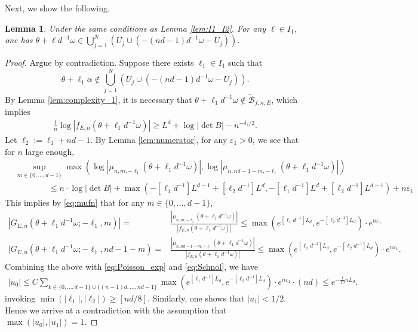 \documentclass[11pt]{amsart}
\newtheorem{lemma}[theorem]{Lemma}
\begin{document}
Next, we show the following.
\begin{lemma}\label{lem:I1_small}
Under the same conditions as Lemma \ref{lem:I1_I2}.
For any $\ell\in I_1$, one has $\theta+\ell d^{-1}\omega\in \bigcup_{j=1}^{N}(U_j\cup (-(nd-1)d^{-1}\omega-U_j))$.
\end{lemma}
\begin{proof}
Argue by contradiction. 
Suppose there exists $\ell_1\in I_1$ such that 
$$\theta+\ell_1\alpha\notin \bigcup_{j=1}^{N}(U_j\cup (-(nd-1)d^{-1}\omega-U_j)).$$
By Lemma \ref{lem:complexity_1}, it is necessary that $\theta+\ell_1d^{-1}\omega\notin \widetilde{\mathcal{B}}_{f,n,E}$, which implies
\begin{align}\label{eq:u_I1_large}
\frac{1}{n}\log |f_{E,n}(\theta+\ell_1d^{-1}\omega)|\geq L^d+\log |\det B|-n^{-\delta_1/2}.
\end{align}
Let $\ell_2:=\ell_1+nd-1$. 
By Lemma \ref{lem:numerator}, for any $\varepsilon_1>0$, we see that for $n$ large enough, 
\begin{align}\label{eq:Dk_upper}
&\sup_{m\in \{0,...,d-1\}}\max(\log |\mu_{n,m,-\ell_1}(\theta+\ell_1d^{-1}\omega)|, \log |\mu_{n,nd-1-m,-\ell_1}(\theta+\ell_1 d^{-1}\omega)|)\\
&\qquad\qquad \leq n\cdot \log |\det B|+\max(-[\ell_1d^{-1}] L^{d-1}+[\ell_2d^{-1}] L^d, -[\ell_1d^{-1}] L^d+[\ell_2d^{-1}] L^{d-1})+n\varepsilon_1
\end{align}
This implies by \eqref{eq:mufn} that for any $m\in \{0,...,d-1\}$,
\begin{align}\label{eq:Green_I1}
    |G_{E,n}(\theta+\ell_1d^{-1}\omega; -\ell_1, m)|=&\frac{|\mu_{n,m,-\ell_1}(\theta+\ell_1d^{-1}\omega)|}{|f_{E,n}(\theta+\ell_1d^{-1}\omega)|}\leq \max(e^{[\ell_1d^{-1}]L_d}, e^{-[\ell_2d^{-1}] L_d})\cdot  e^{n\varepsilon_1}\\
    |G_{E,n}(\theta+\ell_1d^{-1}\omega; -\ell_1, nd-1-m)=&\frac{|\mu_{n,nd-1-m,-\ell_1}(\theta+\ell_1d^{-1}\omega)|}{|f_{E,n}(\theta+\ell_1d^{-1}\omega)|}\leq \max(e^{[\ell_1d^{-1}] L_d}, e^{-[\ell_2d^{-1}] L_d})\cdot  e^{n\varepsilon_1}.
\end{align}
Combining the above with \eqref{eq:Poisson_exp} and \eqref{eq:Schnol}, we have
\begin{align}\label{eq:phi0}
|u_0|
\leq C\sum_{k\in \{0,...,d-1\}\cup \{(n-1)d,...,nd-1\}}\max(e^{[\ell_1d^{-1}] L_d}, e^{-[\ell_2d^{-1}] L_d})\cdot  e^{n\varepsilon_1} \cdot (nd)
\leq e^{-\frac{1}{10} n L_d}.
\end{align}
invoking $\min(|\ell_1|, |\ell_2|)\geq [nd/8]$. 
Similarly, one shows that $|u_1|<1/2$.
Hence we arrive at a contradiction with the assumption that $\max(|u_0|, |u_1|)=1$.
\end{proof}
\end{document}
